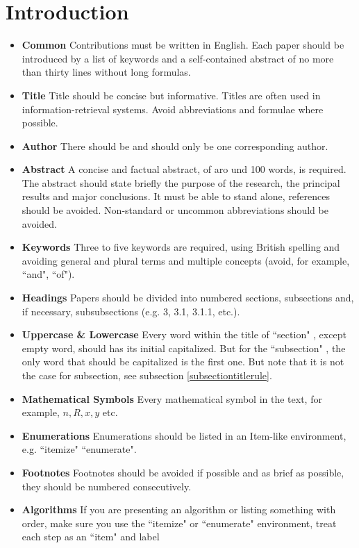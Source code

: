 \documentclass[print]{jicspack}
\begin{document}
\section{Introduction}
\label{Maintext}
\begin{itemize}
\item{\bf Common} Contributions must be written in English. Each
paper should be introduced by a list of keywords and a
self-contained abstract of no more than thirty lines without long
formulas. \item{\bf Title} Title should be concise but
informative. Titles are often used in information-retrieval
systems. Avoid abbreviations and formulae where possible.
\item{\bf Author} There should be and should only be one
corresponding author. \item{\bf Abstract} A concise and factual
abstract, of aro und 100 words, is required. The abstract should
state briefly the purpose of the research, the principal results
and major conclusions. It must be able to stand alone, references
should be avoided. Non-standard or uncommon abbreviations should
be avoided. \item{\bf Keywords} Three to five keywords are
required, using British spelling and avoiding general and plural
terms and multiple concepts (avoid, for example, ``and", ``of").
\item{\bf Headings} Papers should be divided into numbered
sections, subsections and, if necessary, subsubsections (e.g. 3,
3.1, 3.1.1, etc.). \item{\bf Uppercase \& Lowercase} Every word
within the title of ``section" , except empty word, should has its
initial capitalized. But for the ``subsection" , the only word
that should be capitalized is the first one. But note that it is
not the case for subsection, see subsection
\ref{subsectiontitlerule}. \item{\bf Mathematical Symbols} Every
mathematical symbol in the text, for example, $n, R, x, y$ etc.
\item{\bf Enumerations} Enumerations should be listed in an
Item-like environment, e.g. ``itemize" ``enumerate". \item{\bf
Footnotes} Footnotes should be avoided if possible and as brief as
possible, they should be numbered consecutively. \item{\bf
Algorithms} If you are presenting an algorithm or listing
something with order, make sure you use the ``itemize" or
``enumerate"  environment, treat each step as an ``item" and label

\end{itemize}
\end{document}
